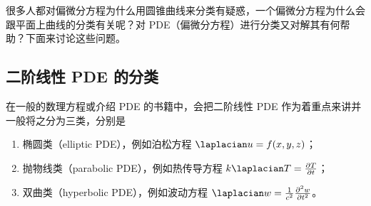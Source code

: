 很多人都对偏微分方程为什么用圆锥曲线来分类有疑惑，一个偏微分方程为什么会跟平面上曲线的分类有关呢？对 PDE（偏微分方程）进行分类又对解其有何帮助？下面来讨论这些问题。

\subsection{二阶线性 PDE 的分类}
在一般的数理方程或介绍 PDE 的书籍中，会把二阶线性 PDE 作为着重点来讲并一般将之分为三类，分别是
\begin{enumerate}
\item 椭圆类（elliptic PDE），例如泊松方程 $\laplacian u = f(x,y,z)$；
\item 抛物线类（parabolic PDE），例如热传导方程 $k \laplacian T = \frac{\partial T}{\partial t}$；
\item 双曲类（hyperbolic PDE），例如波动方程 $\laplacian w = \frac{1}{c^2} \frac{\partial^2 w}{\partial t^2}$。
\end{enumerate}
